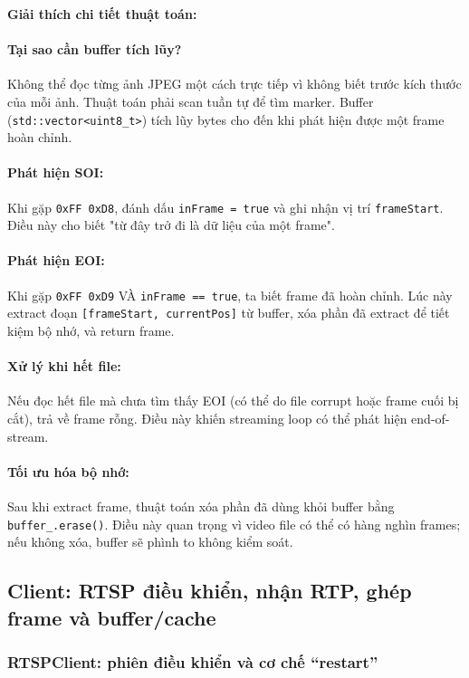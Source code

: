 \textbf{Giải thích chi tiết thuật toán:}

\paragraph{Tại sao cần buffer tích lũy?} Không thể đọc từng ảnh JPEG một cách trực tiếp vì không biết trước kích thước của mỗi ảnh. Thuật toán phải scan tuần tự để tìm marker. Buffer (\texttt{std::vector<uint8\_t>}) tích lũy bytes cho đến khi phát hiện được một frame hoàn chỉnh.

\paragraph{Phát hiện SOI:} Khi gặp \texttt{0xFF 0xD8}, đánh dấu \texttt{inFrame = true} và ghi nhận vị trí \texttt{frameStart}. Điều này cho biết "từ đây trở đi là dữ liệu của một frame".

\paragraph{Phát hiện EOI:} Khi gặp \texttt{0xFF 0xD9} VÀ \texttt{inFrame == true}, ta biết frame đã hoàn chỉnh. Lúc này extract đoạn \texttt{[frameStart, currentPos]} từ buffer, xóa phần đã extract để tiết kiệm bộ nhớ, và return frame.

\paragraph{Xử lý khi hết file:} Nếu đọc hết file mà chưa tìm thấy EOI (có thể do file corrupt hoặc frame cuối bị cắt), trả về frame rỗng. Điều này khiến streaming loop có thể phát hiện end-of-stream.

\paragraph{Tối ưu hóa bộ nhớ:} Sau khi extract frame, thuật toán xóa phần đã dùng khỏi buffer bằng \texttt{buffer\_.erase()}. Điều này quan trọng vì video file có thể có hàng nghìn frames; nếu không xóa, buffer sẽ phình to không kiểm soát.

\subsection{Client: RTSP điều khiển, nhận RTP, ghép frame và buffer/cache}

\subsubsection{RTSPClient: phiên điều khiển và cơ chế ``restart''}


